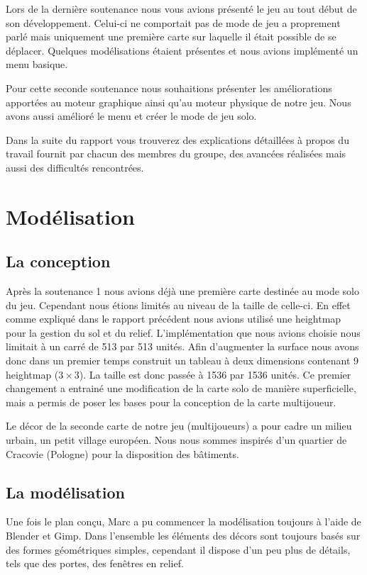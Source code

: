 \documentclass[11pt]{report}
\begin{document}
Lors de la dernière soutenance nous vous avions présenté le jeu au tout début de son développement. Celui-ci ne comportait pas de mode de jeu a proprement parlé mais uniquement une première carte sur laquelle il était possible de se déplacer. Quelques modélisations étaient présentes et nous avions implémenté un menu basique.

Pour cette seconde soutenance nous souhaitions présenter les améliorations apportées au moteur graphique ainsi qu’au moteur physique de notre jeu. Nous avons aussi amélioré le menu et créer le mode de jeu solo.

Dans la suite du rapport vous trouverez des explications détaillées à propos du travail fournit par chacun des membres du groupe, des avancées réalisées mais aussi des difficultés rencontrées.

\newpage
\section{Modélisation}

\subsection{La conception}

Après la soutenance 1 nous avions déjà une première carte destinée au mode solo du jeu. Cependant nous étions limités au niveau de la taille de celle-ci. En effet comme expliqué dans le rapport précédent nous avions utilisé une heightmap pour la gestion du sol et du relief. L’implémentation que nous avions choisie nous limitait à un carré de 513 par 513 unités. Afin d’augmenter la surface nous avons donc dans un premier temps construit un tableau à deux dimensions contenant 9 heightmap (\(3 \times 3\)). La taille est donc passée à 1536 par 1536 unités. Ce premier changement a entrainé une modification de la carte solo de manière superficielle, mais a permis de poser les bases pour la conception de la carte multijoueur.

Le décor de la seconde carte de notre jeu (multijoueurs) a pour cadre un milieu urbain, un petit village européen. Nous nous sommes inspirés d’un quartier de Cracovie (Pologne) pour la disposition des bâtiments.

\subsection{La modélisation}

Une fois le plan conçu, Marc a pu commencer la modélisation toujours à l’aide de Blender et Gimp.
Dans l’ensemble les éléments des décors sont toujours basés sur des formes géométriques simples, cependant il dispose d’un peu plus de détails, tels que des portes, des fenêtres en relief.
\end{document}
